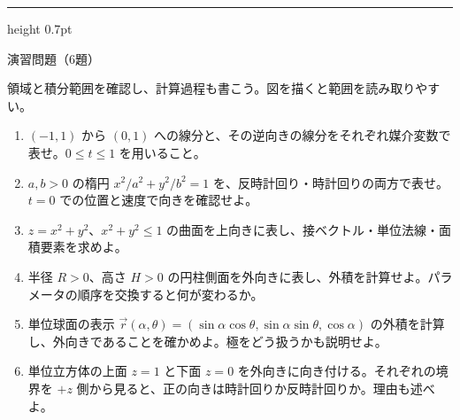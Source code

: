 \documentclass[a4paper,10pt,pdflatex,ja=standard,jafont=ipaex-type1,
  magstyle=real,scale=1]{bxjsarticle}
\newcommand{\topic}[1]{\par\vspace{5pt}%
  {\large\sffamily\mdseries\color{accent}#1}\par\vspace{2pt}}
\newenvironment{problems}
  {\begin{enumerate}[leftmargin=2em,itemsep=3pt,topsep=3pt,parsep=0pt,
    font=\color{accent}]}
  {\end{enumerate}}
\newcommand{\problemspace}{\par\vspace{5mm}}
\newcommand{\exercises}{%
  {\color{accent}\hrule height 0.7pt}\vspace{3pt}%
  \topic{演習問題（6題）}%
  {\small 領域と積分範囲を確認し、計算過程も書こう。図を描くと範囲を読み取りやすい。}\par}
\begin{document}
\noindent\begin{minipage}[b][0.5\textheight][t]{\linewidth}
\exercises
\begin{problems}
\item $(-1,1)$ から $(0,1)$ への線分と、その逆向きの線分をそれぞれ媒介変数で表せ。$0\le t\le1$ を用いること。
\problemspace

\item $a,b>0$ の楕円 $x^2/a^2+y^2/b^2=1$ を、反時計回り・時計回りの両方で表せ。$t=0$ での位置と速度で向きを確認せよ。
\problemspace

\item $z=x^2+y^2$、$x^2+y^2\le1$ の曲面を上向きに表し、接ベクトル・単位法線・面積要素を求めよ。
\problemspace

\item 半径 $R>0$、高さ $H>0$ の円柱側面を外向きに表し、外積を計算せよ。パラメータの順序を交換すると何が変わるか。
\problemspace

\item 単位球面の表示 $\vec r(\alpha,\theta)=(\sin\alpha\cos\theta,\sin\alpha\sin\theta,\cos\alpha)$ の外積を計算し、外向きであることを確かめよ。極をどう扱うかも説明せよ。
\problemspace

\item 単位立方体の上面 $z=1$ と下面 $z=0$ を外向きに向き付ける。それぞれの境界を $+z$ 側から見ると、正の向きは時計回りか反時計回りか。理由も述べよ。
\problemspace
\end{problems}
\end{minipage}
\end{document}
